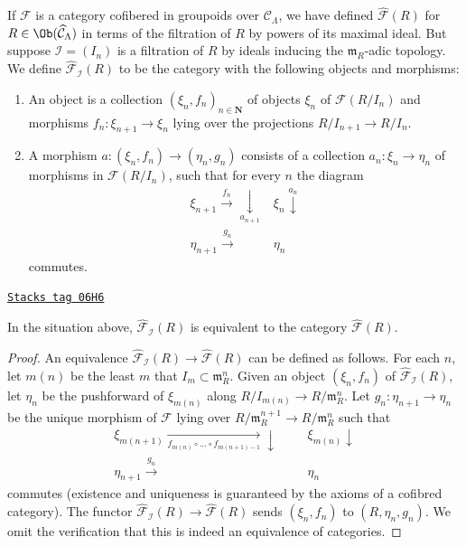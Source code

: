 If $\mathcal{F}$ is a category cofibered in groupoids over $\mathcal
C_\Lambda$, we have defined $\widehat{\mathcal{F}}(R)$ for $R \in
\Ob(\widehat{\mathcal{C}}_\Lambda)$ in terms of the filtration of
$R$ by powers of its maximal ideal.  But suppose $\mathcal{I} = (I_n)$ is a
filtration of $R$ by ideals inducing the $\mathfrak{m}_R$-adic topology.  We
define $\widehat{\mathcal{F}}_\mathcal{I}(R)$ to be the category with the
following objects and morphisms:
\begin{enumerate}
\item An object is a collection $(\xi_n, f_n)_{n \in \mathbf{N}}$ of
objects $\xi_n$ of $\mathcal{F}(R/I_n)$ and morphisms
$f_n : \xi_{n + 1} \to \xi_n$ lying over the projections
$R/I_{n + 1} \to R/I_n$.
\item A morphism $a : (\xi_n, f_n) \to (\eta_n, g_n)$ consists of a
collection $a_n : \xi_n \to \eta_n$ of morphisms in
$\mathcal{F}(R/I_n)$, such that for every $n$ the diagram
$$
\begin{array}{cc}\xi_{n + 1} \overset{f_n}{\longrightarrow}\underset{a_{n + 1}}{\downarrow} & \xi_n \overset{a_n}{\downarrow} \\ \eta_{n + 1} \overset{g_n}{\longrightarrow} & \eta_n\end{array}
$$
commutes.
\end{enumerate}

\begin{lemma}
\label{formal-defos-lemma-formal-objects-different-filtration}
\href{https://stacks.math.columbia.edu/tag/06H6}{\texttt{Stacks tag 06H6}}

In the situation above, $\widehat{\mathcal{F}}_\mathcal{I}(R)$ is equivalent
to the category $\widehat{\mathcal{F}}(R)$.
\end{lemma}

\begin{proof}
An equivalence
$\widehat{\mathcal{F}}_\mathcal{I}(R) \to \widehat{\mathcal{F}}(R)$
can be defined as follows.  For each $n$, let $m(n)$ be the least $m$
that $I_m \subset \mathfrak m_R^n$.  Given an object
$(\xi_n, f_n)$ of $\widehat{\mathcal{F}}_\mathcal{I}(R)$, let
$\eta_n$ be the pushforward of $\xi_{m(n)}$ along
$R/I_{m(n)} \to R/\mathfrak m_R^n$. Let $g_n : \eta_{n + 1} \to \eta_n$
be the unique morphism of $\mathcal{F}$ lying over
$R/\mathfrak m_R^{n + 1} \to R/\mathfrak m_R^n$ such that
$$
\begin{array}{cccc}\xi_{m(n + 1)} \underset{f_{m(n)} \circ \ldots \circ f_{m(n + 1) - 1}}{\longrightarrow}\downarrow &  &  & \xi_{m(n)} \downarrow \\ \eta_{n + 1} \overset{g_n}{\longrightarrow} &  &  & \eta_n\end{array}
$$
commutes (existence and uniqueness is guaranteed by the axioms of a
cofibred category). The functor
$\widehat{\mathcal{F}}_\mathcal{I}(R) \to \widehat{\mathcal{F}}(R)$
sends $(\xi_n, f_n)$ to $(R, \eta_n, g_n)$. We omit the
verification that this is indeed an equivalence of categories.
\end{proof}


